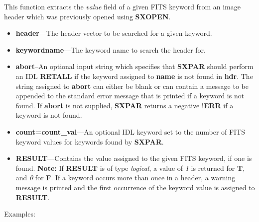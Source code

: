 \begin{description}
This function extracts the {\it value} field of a given FITS keyword from an image 
header which was previously opened using {\bf SXOPEN}.

\begin{itemize}

\item {\bf header}---The header vector to be searched for a given keyword.

\item {\bf keywordname}---The keyword name to search the header for.

\item {\bf abort}--An optional input string which specifies that {\bf SXPAR} 
should perform an IDL {\bf RETALL} if the keyword assigned to {\bf name} is 
not found in {\bf hdr}.  The string assigned to {\bf abort} can either be 
blank or can contain a message to be appended to the standard error message 
that is printed if a keyword is not found.  If {\bf abort} is not supplied, 
{\bf SXPAR}  returns a negative {\bf $!$ERR} if a keyword is not 
found.

\item {\bf count=count\_val}---An optional IDL keyword set to the number of 
FITS keyword values for keywords found by {\bf SXPAR}.
\newpage
\item {\bf RESULT}---Contains 
the value assigned to the given FITS 
keyword, if one is found.  {\bf Note:} If {\bf RESULT} is of type 
{\it logical}, a value of {\it 1} is returned 
for {\bf T}, and {\it 0} for {\bf F}.  If a keyword occurs more 
than once in a header, a warning message is printed and the first occurrence 
of the keyword value is assigned to {\bf RESULT}.
\end{itemize}

\noindent
Examples:\\


\end{description}
